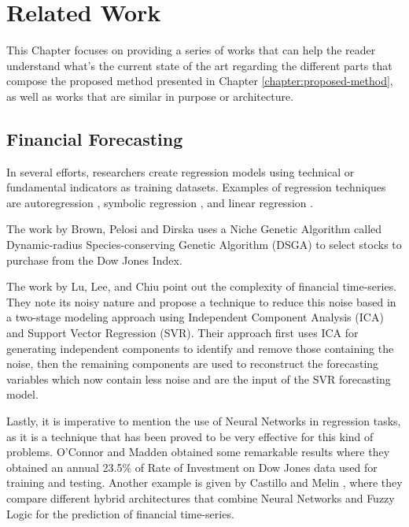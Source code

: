 \chapter{Related Work}
\label{chapter:related-work}

This Chapter focuses on providing a series of works that can help the reader
understand what's the current state of the art regarding the different parts
that compose the proposed method presented in Chapter
\ref{chapter:proposed-method}, as well as works that are similar in purpose or
architecture.

\section{Financial Forecasting}
\label{section:financial-forecasting}

In several efforts, researchers create regression models using
technical or fundamental indicators as training datasets. Examples of regression
techniques are autoregression \cite{burg1968new}, symbolic regression 
\cite{billard2002symbolic}, and linear regression \cite{kutner2004applied}.


The work by Brown, Pelosi and Dirska \cite{brown2013dynamic} uses a Niche
Genetic Algorithm called Dynamic-radius Species-conserving Genetic Algorithm
(DSGA) to select stocks to purchase from the Dow Jones Index.

The work by Lu, Lee, and Chiu \cite{Lu2009} point out the complexity of
financial time-series. They note its noisy nature and propose a technique to
reduce this noise based in a two-stage modeling approach using Independent
Component Analysis (ICA) and Support Vector Regression (SVR). Their approach
first uses ICA for generating independent components to identify and remove
those containing the noise, then the remaining components are used to
reconstruct the forecasting variables which now contain less noise and are the
input of the SVR forecasting model.


Lastly, it is imperative to mention the use of Neural Networks in regression
tasks, as it is a technique that has been proved to be very effective for this
kind of problems. O'Connor and Madden \cite{Connor2005} obtained some remarkable
results where they obtained an annual 23.5\% of Rate of Investment on Dow Jones
data used for training and testing. Another example is given by Castillo and
Melin \cite{castillo2001simulation}, where they compare different hybrid
architectures that combine Neural Networks and Fuzzy Logic for the prediction of
financial time-series.

